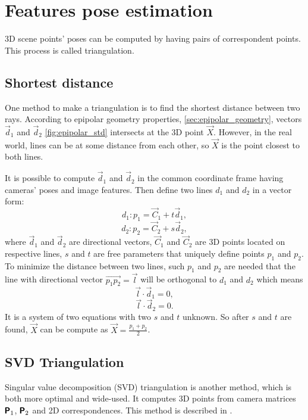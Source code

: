 \section{Features pose estimation}

3D scene points' poses can be computed by having pairs of correspondent points.
This process is called triangulation.

\subsection{Shortest distance}
One method to make a triangulation is to find the shortest distance between two rays.
According to epipolar geometry properties, \autoref{sec:epipolar_geometry}, vectors $\vec{d}_1$ and $\vec{d}_2$ \autoref{fig:epipolar_std} intersects at the 3D point $\vec{X}$.
However, in the real world, lines can be at some distance from each other, so $\vec{X}$ is the point closest to both lines.

It is possible to compute $\vec{d}_1$ and $\vec{d}_2$ in the common coordinate frame having cameras' poses and image features.
Then define two lines $d_1$ and $d_2$ in a vector form:
\begin{equation}
    d_1: p_1 = \vec{C}_1 + t \vec{d}_1,
\end{equation}
\begin{equation}
    d_2: p_2 = \vec{C}_2 + s \vec{d}_2,
\end{equation}
where $\vec{d}_1$ and $\vec{d}_2$ are directional vectors, $\vec{C}_1$ and $\vec{C}_2$ are 3D points located on respective lines, $s$ and $t$ are free parameters that uniquely define points $p_1$ and $p_2$. 
To minimize the distance between two lines, such $p_1$ and $p_2$ are needed that the line with directional vector $\vec{p_1p_2} = \vec{l}$ will be orthogonal to $d_1$ and $d_2$ which means
\begin{equation}
    \label{eq:ldd1}
    \vec{l} \cdot \vec{d}_1 = 0,
\end{equation}
\begin{equation}
    \label{eq:ldd2}
    \vec{l} \cdot \vec{d}_2 = 0.
\end{equation}
It is a system of two equations with two $s$ and $t$ unknown.
So after $s$ and $t$ are found, $\vec{X}$ can be compute as $\vec{X} = \frac{p_1 + p_2}{2}$.

\subsection{SVD Triangulation}
Singular value decomposition (SVD) triangulation is another method, which is both more optimal and wide-used.
It computes 3D points from camera matrices $\pmb{\mathsf{P}}_1$, $\pmb{\mathsf{P}}_2$ and 2D correspondences. 
This method is described in \cite{hartley_zisserman_2004}.


